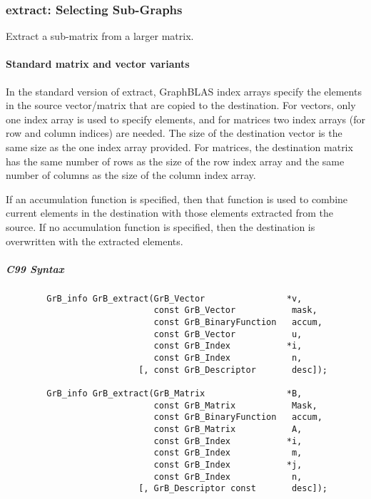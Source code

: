 \subsubsection{{\sf extract}: Selecting Sub-Graphs}

Extract a sub-matrix from a larger matrix. 

\paragraph{Standard matrix and vector variants}

In the standard version of {\sf extract}, GraphBLAS index arrays
specify the elements in the source vector/matrix that are copied to
the destination.  For vectors, only one index array is used to specify
elements, and for matrices two index arrays (for row and column indices)
are needed.  The size of the destination vector is the same size as
the one index array provided.  For matrices, the destination matrix has
the same number of rows as the size of the row index array and the same
number of columns as the size of the column index array.

If an accumulation function is specified,
then that function is
used to combine current elements in the destination with those elements
extracted from the source. If no accumulation function is specified, then
the destination is overwritten with the extracted elements.

\subparagraph{C99 Syntax}

\begin{verbatim}
        GrB_info GrB_extract(GrB_Vector                *v,
                             const GrB_Vector           mask,
                             const GrB_BinaryFunction   accum,
                             const GrB_Vector           u,
                             const GrB_Index           *i,
                             const GrB_Index            n,
                          [, const GrB_Descriptor       desc]);
                  
        GrB_info GrB_extract(GrB_Matrix                *B,
                             const GrB_Matrix           Mask,
                             const GrB_BinaryFunction   accum,
                             const GrB_Matrix           A,
                             const GrB_Index           *i,
                             const GrB_Index            m,
                             const GrB_Index           *j,
                             const GrB_Index            n,
                          [, GrB_Descriptor const       desc]);
\end{verbatim}

